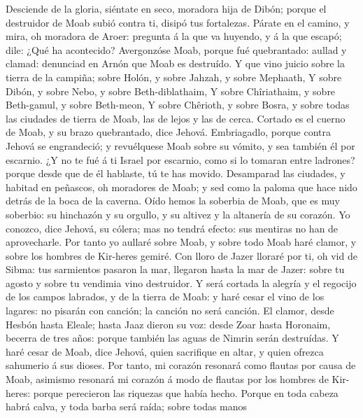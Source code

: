 Desciende de la gloria, siéntate en seco, moradora hija de Dibón; porque
el destruidor de Moab subió contra ti, disipó tus fortalezas.
 Párate en el camino, y mira, oh moradora de Aroer:
pregunta á la que va huyendo, y á la que escapó; dile: ¿Qué ha
acontecido?  Avergonzóse Moab, porque fué quebrantado:
aullad y clamad: denunciad en Arnón que Moab es destruído.
 Y que vino juicio sobre la tierra de la campiña; sobre
Holón, y sobre Jahzah, y sobre Mephaath,  Y sobre Dibón,
y sobre Nebo, y sobre Beth-diblathaim,  Y sobre
Chîriathaim, y sobre Beth-gamul, y sobre Beth-meon,  Y
sobre Chêrioth, y sobre Bosra, y sobre todas las ciudades de tierra de
Moab, las de lejos y las de cerca.  Cortado es el cuerno
de Moab, y su brazo quebrantado, dice Jehová. 
Embriagadlo, porque contra Jehová se engrandeció; y revuélquese Moab
sobre su vómito, y sea también él por escarnio.  ¿Y no te
fué á ti Israel por escarnio, como si lo tomaran entre ladrones? porque
desde que de él hablaste, tú te has movido.  Desamparad
las ciudades, y habitad en peñascos, oh moradores de Moab; y sed como la
paloma que hace nido detrás de la boca de la caverna. 
Oído hemos la soberbia de Moab, que es muy soberbio: su hinchazón y su
orgullo, y su altivez y la altanería de su corazón.  Yo
conozco, dice Jehová, su cólera; mas no tendrá efecto: sus mentiras no
han de aprovecharle.  Por tanto yo aullaré sobre Moab, y
sobre todo Moab haré clamor, y sobre los hombres de Kir-heres gemiré.
 Con lloro de Jazer lloraré por ti, oh vid de Sibma: tus
sarmientos pasaron la mar, llegaron hasta la mar de Jazer: sobre tu
agosto y sobre tu vendimia vino destruidor.  Y será
cortada la alegría y el regocijo de los campos labrados, y de la tierra
de Moab: y haré cesar el vino de los lagares: no pisarán con canción; la
canción no será canción.  El clamor, desde Hesbón hasta
Eleale; hasta Jaaz dieron su voz: desde Zoar hasta Horonaim, becerra de
tres años: porque también las aguas de Nimrin serán destruídas.
 Y haré cesar de Moab, dice Jehová, quien sacrifique en
altar, y quien ofrezca sahumerio á sus dioses.  Por
tanto, mi corazón resonará como flautas por causa de Moab, asimismo
resonará mi corazón á modo de flautas por los hombres de Kir-heres:
porque perecieron las riquezas que había hecho.  Porque
en toda cabeza habrá calva, y toda barba será raída; sobre todas manos

